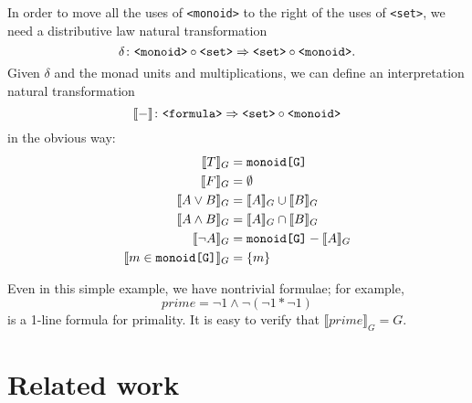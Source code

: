 \documentclass{article}
\newcommand{\interp}[1]{\llbracket #1 \rrbracket}
\newcommand{\maps}{\colon}
\newcommand{\gram}[1]{\mbox{\tt <#1>}}
\begin{document}
In order to move all the uses of {\tt <monoid>} to the right of the uses of {\tt <set>}, we need a distributive law natural transformation
\[ \delta\maps \gram{monoid}\circ\gram{set} \Rightarrow \gram{set}\circ\gram{monoid}. \]
Given $\delta$ and the monad units and multiplications, we can define an interpretation natural transformation
\[ \interp{-}\maps \gram{formula}\Rightarrow\gram{set}\circ\gram{monoid} \]
in the obvious way:
\begin{align*}
  \interp{T}_G &= \mbox{\tt monoid[G]}\\
  \interp{F}_G &= \emptyset\\
  \interp{{A}\lor{B}}_G &= \interp{A}_G \cup \interp{B}_G\\
  \interp{{A}\land{B}}_G &= \interp{A}_G \cap \interp{B}_G\\
  \interp{\neg A}_G &= \mbox{\tt monoid[G]} - \interp{A}_G\\
  \interp{m \in \mbox{\tt monoid[G]}}_G &= \{m\}
\end{align*}

Even in this simple example, we have nontrivial formulae; for example,
\[ prime = \neg 1 \land \neg(\neg 1 * \neg 1) \]
is a 1-line formula for primality.  It is easy to verify that $\interp{prime}_G = G.$

\section{Related work}
\end{document}
